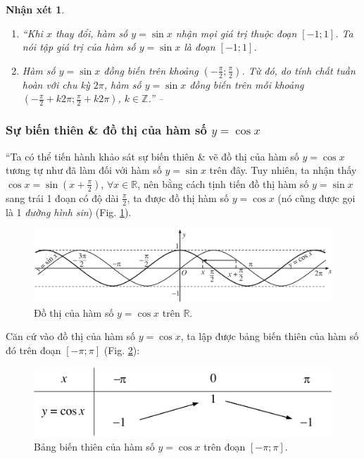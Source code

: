 \documentclass[oneside]{book}
\numberwithin{equation}{section}
\newtheorem{nhanxet}{Nhận xét}[section]
\begin{document}
\begin{nhanxet}
	\begin{enumerate}
		\item ``Khi $x$ thay đổi, hàm số $y = \sin x$ nhận mọi giá trị thuộc đoạn $[-1;1]$. Ta nói \emph{tập giá trị} của hàm số $y = \sin x$ là đoạn $[-1;1]$.
		\item Hàm số $y = \sin x$ đồng biến trên khoảng $\left(-\frac{\pi}{2};\frac{\pi}{2}\right)$. Từ đó, do tính chất tuần hoàn với chu kỳ $2\pi$, hàm số $y = \sin x$ đồng biến trên mỗi khoảng $\left(-\frac{\pi}{2} + k2\pi;\frac{\pi}{2} + k2\pi\right)$, $k\in\mathbb{Z}$.'' -- \cite[p. 7]{SGK_Toan_11_dai_so_giai_tich_nang_cao}
	\end{enumerate}
\end{nhanxet}

\subsubsection{Sự biến thiên \& đồ thị của hàm số $y = \cos x$}
``Ta có thể tiến hành khảo sát sự biến thiên \& vẽ đồ thị của hàm số $y = \cos x$ tương tự như đã làm đối với hàm số $y = \sin x$ trên đây. Tuy nhiên, ta nhận thấy $\cos x = \sin\left(x + \frac{\pi}{2}\right)$, $\forall x\in\mathbb{R}$, nên bằng cách tịnh tiến đồ thị hàm số $y = \sin x$ sang trái 1 đoạn có độ dài $\frac{\pi}{2}$, ta được đồ thị hàm số $y = \cos x$ (nó cũng được gọi là 1 \textit{đường hình sin}) (Fig. \ref{fig:graph cos}).

\begin{figure}[H]
	\centering
	\includegraphics[scale=0.2]{graph_cos}
	\caption{Đồ thị của hàm số $y = \cos x$ trên $\mathbb{R}$.}
	\label{fig:graph cos}
\end{figure}
Căn cứ vào đồ thị của hàm số $y = \cos x$, ta lập được bảng biến thiên của hàm số đó trên đoạn $[-\pi;\pi]$ (Fig. \ref{fig:bang bien thien cos}):

\begin{figure}[H]
	\centering
	\includegraphics[scale=0.15]{bang_bien_thien_cos}
	\caption{Bảng biến thiên của hàm số $y = \cos x$ trên đoạn $[-\pi;\pi]$.}
	\label{fig:bang bien thien cos}
\end{figure}
\end{document}
